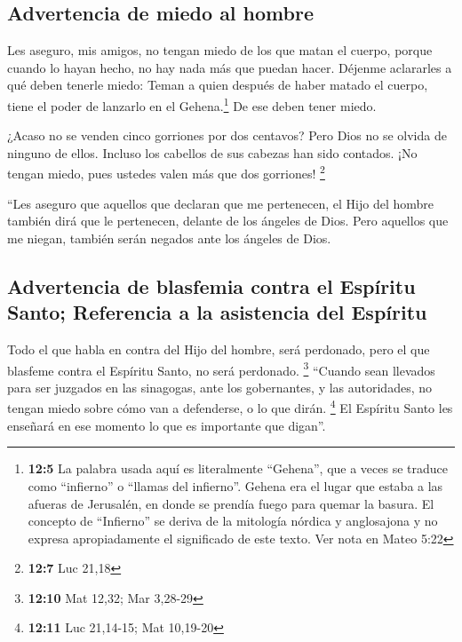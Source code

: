 \hypertarget{advertencia-de-miedo-al-hombre}{%
\subsection{Advertencia de miedo al
hombre}\label{advertencia-de-miedo-al-hombre}}

 Les aseguro, mis amigos, no tengan miedo de los que matan
el cuerpo, porque cuando lo hayan hecho, no hay nada más que puedan
hacer.  Déjenme aclararles a qué deben tenerle miedo:
Teman a quien después de haber matado el cuerpo, tiene el poder de
lanzarlo en el Gehena.\footnote{\textbf{12:5} La palabra usada aquí es
  literalmente ``Gehena'', que a veces se traduce como ``infierno'' o
  ``llamas del infierno''. Gehena era el lugar que estaba a las afueras
  de Jerusalén, en donde se prendía fuego para quemar la basura. El
  concepto de ``Infierno'' se deriva de la mitología nórdica y
  anglosajona y no expresa apropiadamente el significado de este texto.
  Ver nota en Mateo 5:22} De ese deben tener miedo.

 ¿Acaso no se venden cinco gorriones por dos centavos?
Pero Dios no se olvida de ninguno de ellos.  Incluso los
cabellos de sus cabezas han sido contados. ¡No tengan miedo, pues
ustedes valen más que dos gorriones! \footnote{\textbf{12:7} Luc 21,18}

 ``Les aseguro que aquellos que declaran que me
pertenecen, el Hijo del hombre también dirá que le pertenecen, delante
de los ángeles de Dios.  Pero aquellos que me niegan,
también serán negados ante los ángeles de Dios.

\hypertarget{advertencia-de-blasfemia-contra-el-espuxedritu-santo-referencia-a-la-asistencia-del-espuxedritu}{%
\subsection{Advertencia de blasfemia contra el Espíritu Santo;
Referencia a la asistencia del
Espíritu}\label{advertencia-de-blasfemia-contra-el-espuxedritu-santo-referencia-a-la-asistencia-del-espuxedritu}}

 Todo el que habla en contra del Hijo del hombre, será
perdonado, pero el que blasfeme contra el Espíritu Santo, no será
perdonado. \footnote{\textbf{12:10} Mat 12,32; Mar 3,28-29}
 ``Cuando sean llevados para ser juzgados en las
sinagogas, ante los gobernantes, y las autoridades, no tengan miedo
sobre cómo van a defenderse, o lo que dirán. \footnote{\textbf{12:11}
  Luc 21,14-15; Mat 10,19-20}  El Espíritu Santo les
enseñará en ese momento lo que es importante que digan''.

